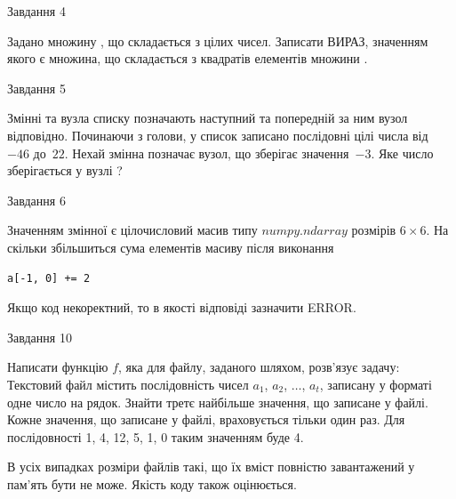 \documentclass[12pt, ukrainian]{article}
\begin{document}
{               
{\begin{center}Завдання {4}\end{center}}
\vspace{-6mm}
Задано множину , що складається з цілих чисел. Записати ВИРАЗ, значенням якого є множина, що складається  з квадратів елементів множини .\par

\vspace{10mm}
               
{\begin{center}Завдання {5}\end{center}}
\vspace{-6mm}
Змінні  та  вузла списку позначають наступний та попередній за ним вузол відповідно. Починаючи з голови, у список записано послідовні цілі числа від~$-46$ до~$22$. Нехай змінна  позначає вузол, що зберігає значення~$-3$.
Яке число зберігається у вузлі  ?\par

               
{\begin{center}Завдання {6}\end{center}}
\vspace{-6mm}
Значенням змінної  є цілочисловий масив типу $numpy.ndarray$ розмірів $6{\times}6$. На скільки збільшиться сума елементів масиву  після виконання
\begin{verbatim}
a[-1, 0] += 2
\end{verbatim}


Якщо код некоректний, то в якості відповіді зазначити ERROR.\par

               
{\begin{center}Завдання {10}\end{center}}
\vspace{-6mm}

Написати функцію $f$, яка для файлу, заданого шляхом, розв’язує задачу:\\ Текстовий файл містить послідовність чисел $a_1$, $a_2$, $\ldots$, $a_t$, записану у форматі одне число на рядок. Знайти третє найбільше значення, що записане у файлі. Кожне значення, що записане у файлі, враховується тільки один раз. Для послідовності 1, 4, 12, 5, 1, 0 таким значенням буде 4.

В усіх випадках розміри файлів такі, що їх вміст повністю завантажений у пам'ять бути не може. Якість коду також оцінюється.



}
\end{document}
